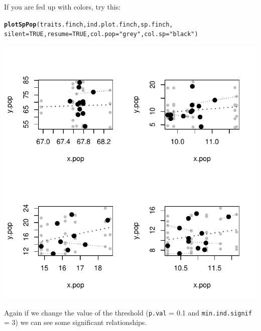 \documentclass[12pt]{article}\usepackage[]{graphicx}\usepackage[]{color}
\makeatletter
\def\maxwidth{ %
  \ifdim\Gin@nat@width>\linewidth
    \linewidth
  \else
    \Gin@nat@width
  \fi
}
\newcommand{\hlnum}[1]{\textcolor[rgb]{0.686,0.059,0.569}{#1}}%
\newcommand{\hlstr}[1]{\textcolor[rgb]{0.192,0.494,0.8}{#1}}%
\newcommand{\hlstd}[1]{\textcolor[rgb]{0.345,0.345,0.345}{#1}}%
\newcommand{\hlkwc}[1]{\textcolor[rgb]{0.333,0.667,0.333}{#1}}%
\newcommand{\hlkwd}[1]{\textcolor[rgb]{0.737,0.353,0.396}{\textbf{#1}}}%
\newenvironment{kframe}{%
 \def\at@end@of@kframe{}%
 \ifinner\ifhmode%
  \def\at@end@of@kframe{\end{minipage}}%
  \begin{minipage}{\columnwidth}%
 \fi\fi%
 \def\FrameCommand##1{\hskip\@totalleftmargin \hskip-\fboxsep
 \colorbox{shadecolor}{##1}\hskip-\fboxsep
     \hskip-\linewidth \hskip-\@totalleftmargin \hskip\columnwidth}%
 \MakeFramed {\advance\hsize-\width
   \@totalleftmargin\z@ \linewidth\hsize
   \@setminipage}}%
 {\par\unskip\endMakeFramed%
 \at@end@of@kframe}
\newenvironment{knitrout}{}{} %
\makeatother
\begin{document}
If you are fed up with colors, try this:
\begin{knitrout}
\color{fgcolor}\begin{kframe}
\begin{alltt}
\hlkwd{plotSpPop}\hlstd{(traits.finch, ind.plot.finch, sp.finch,}
      \hlkwc{silent} \hlstd{=} \hlnum{TRUE}\hlstd{,} \hlkwc{resume} \hlstd{=} \hlnum{TRUE}\hlstd{,} \hlkwc{col.pop} \hlstd{=} \hlstr{"grey"}\hlstd{,} \hlkwc{col.sp} \hlstd{=} \hlstr{"black"}\hlstd{)}
\end{alltt}
\end{kframe}

{\centering \includegraphics[width=\maxwidth]{figure/unnamed-chunk-30} 

}



\end{knitrout}

Again if we change the value of the threshold (\texttt{p.val} = 0.1 and \texttt{min.ind.signif} = 3) we can see some significant relationships.
\end{document}
